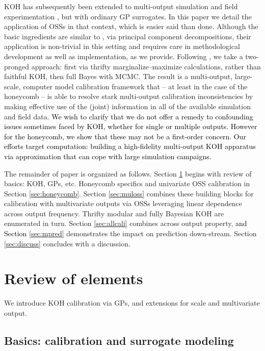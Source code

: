 \documentclass[12pt]{article}
\newcommand{\blunew}[1]{\textcolor{black}{#1}} %
\begin{document}
KOH has subsequently been extended to multi-output simulation and field
experimentation \cite[e.g.][]{Higdon2008}, but with ordinary GP surrogates. In
this paper we detail the application of OSSs in that context, which is easier
said than done.  Although the basic ingredients are similar to 
\citeauthor{Higdon:2004}, via principal component decompositions, 
their application is non-trivial in this setting and requires care in
methodological development as well as implementation, as we provide. Following
\citet{Huang:2018}, we take a two-pronged approach: first via thrifty
marginalize--maximize calculations, rather than faithful KOH, then full Bayes
with MCMC. The result is a multi-output, large-scale, computer model
calibration framework that -- at least in the case of the honeycomb -- is able
to resolve stark multi-output calibration inconsistencies by making effective
use of the (joint) information in all of the available simulation and field
data.  \blunew{We wish to clarify that we do not offer a remedy to confounding
issues sometimes faced by KOH, whether for single or multiple outputs. However
for the honeycomb, we show that these may not be a first-order concern.
Our efforts target computation: building a high-fidelity multi-output KOH
apparatus via approximation that can cope with large simulation campaigns.}

The remainder of paper is organized as follows.  Section \ref{sec:review}
begins with review of basics: KOH, GPs, etc. Honeycomb specifics and
univariate OSS calibration in Section \ref{sec:honeycomb}. Section
\ref{sec:muloss} combines these building blocks for calibration with
multivariate outputs via OSSs leveraging linear dependence across output
frequency. Thrifty modular and fully Bayesian KOH are enumerated in turn.
Section \ref{sec:allcali} combines across output property,
\blunew{and Section \ref{sec:mpred}} demonstrates the impact on 
prediction down-stream. Section \ref{sec:discuss} concludes with a discussion.

\section{Review of elements}
\label{sec:review}

We introduce KOH calibration via GPs, and extensions for scale and
multivariate output.

\subsection{Basics: calibration and surrogate modeling}
\label{sec:basics}
\end{document}
